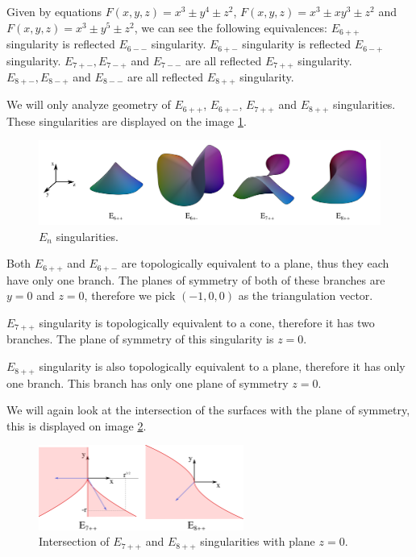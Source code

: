 Given by equations $F(x,y,z)=x^3\pm y^4\pm z^2$, $F(x,y,z)=x^3\pm xy^3\pm z^2$
and $F(x,y,z)=x^3\pm y^5\pm z^2$, we can see the following equivalences:
$E_{6++}$ singularity is reflected $E_{6--}$ singularity.
$E_{6+-}$ singularity is reflected $E_{6-+}$ singularity.
$E_{7+-}, E_{7-+}$ and $E_{7--}$ are all reflected $E_{7++}$ singularity.
$E_{8+-}, E_{8-+}$ and $E_{8--}$ are all reflected $E_{8++}$ singularity.

We will only analyze geometry of $E_{6++}$, $E_{6+-}$, $E_{7++}$ and $E_{8++}$
singularities. These singularities are displayed on the image \ref{img:12}.


\begin{figure}
    \centerline{\includegraphics[width=1\textwidth]{images/img12}}
    \caption[$E_n$ singularities.]
    {$E_n$ singularities. \cite{singsurf}}
    \label{img:12}
\end{figure}

Both $E_{6++}$ and $E_{6+-}$ are topologically equivalent to a plane, thus
they each have only one branch. The planes of symmetry of both of these 
branches are $y=0$ and $z=0$, therefore we pick $(-1, 0, 0)$ as the
triangulation vector.

$E_{7++}$ singularity is topologically equivalent to a cone, therefore it has
two branches. The plane of symmetry of this singularity is $z=0$.

$E_{8++}$ singularity is also topologically equivalent to a plane, therefore
it has only one branch. This branch has only one plane of symmetry $z=0$.

We will again look at the intersection of the surfaces with the plane of 
symmetry, this is displayed on image \ref{img:10}.

\begin{figure}
    \centerline{\includegraphics[width=0.6\textwidth]{images/img10}}
    \caption[Intersection of $E_{7++}$ and $E_{8++}$ singularities with 
    plane $z=0$.]
    {Intersection of $E_{7++}$ and $E_{8++}$ singularities with 
    plane $z=0$.}
    \label{img:10}
\end{figure}


